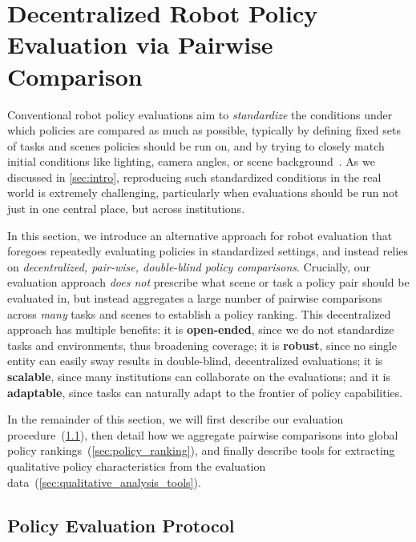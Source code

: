 \section{Decentralized Robot Policy Evaluation via Pairwise Comparison}
\label{sec:method} 

Conventional robot policy evaluations aim to \emph{standardize} the conditions under which policies are compared as much as possible, typically by defining fixed sets of tasks and scenes policies should be run on, and by trying to closely match initial conditions like lighting, camera angles, or scene background~\citep{calli2015ycb, heo2023furniturebench, walke2023bridgedata, kress2024robot}. As we discussed in \cref{sec:intro}, reproducing such standardized conditions in the real world is extremely challenging, particularly when evaluations should be run not just in one central place, but across institutions. 

In this section, we introduce an alternative approach for robot evaluation that foregoes repeatedly evaluating policies in standardized settings, and instead relies on \emph{decentralized, pair-wise, double-blind policy comparisons}. Crucially, our evaluation approach \emph{does not} prescribe what scene or task a policy pair should be evaluated in, but instead aggregates a large number of pairwise comparisons across \emph{many} tasks and scenes to establish a policy ranking. This decentralized approach has multiple benefits:
it is \textbf{open-ended}, since we do not standardize tasks and environments, thus broadening coverage; it is \textbf{robust}, since no single entity can easily sway results in double-blind, decentralized evaluations; it is \textbf{scalable}, since many institutions can collaborate on the evaluations; and it is \textbf{adaptable}, since tasks can naturally adapt to the frontier of policy capabilities.

In the remainder of this section, we will first describe our evaluation procedure~(\cref{sec:eval_procedure}), then detail how we aggregate pairwise comparisons into global policy rankings~(\cref{sec:policy_ranking}), %
and finally describe tools for extracting qualitative policy characteristics from the evaluation data~(\cref{sec:qualitative_analysis_tools}).


\subsection{Policy Evaluation Protocol}
\label{sec:eval_procedure}

